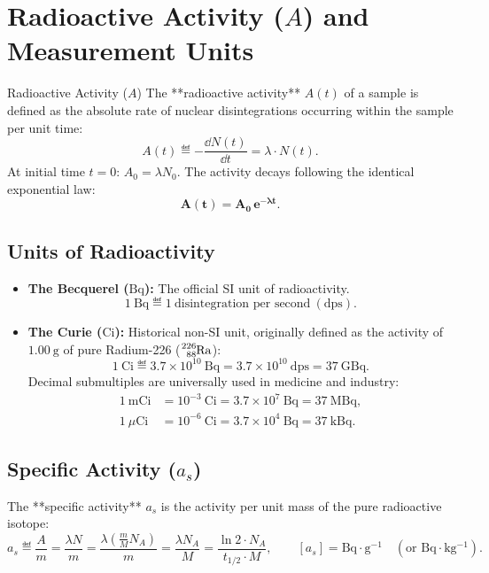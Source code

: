 \section{Radioactive Activity ($A$) and Measurement Units}

\begin{definitionbox}{Radioactive Activity ($A$)}
The **radioactive activity** $A(t)$ of a sample is defined as the absolute rate of nuclear disintegrations occurring within the sample per unit time:
\begin{equation}
A(t) \eqdef -\frac{\dd N(t)}{\dd t} = \lambda \cdot N(t).
\end{equation}
At initial time $t = 0$: $A_0 = \lambda N_0$.
The activity decays following the identical exponential law:
\begin{equation}
\mathbf{A(t) = A_0\,e^{-\lambda t}}.
\end{equation}
\end{definitionbox}

\subsection{Units of Radioactivity}
\begin{itemize}[leftmargin=1.5em,itemsep=4pt]
  \item \textbf{The Becquerel ($\mathrm{Bq}$):} The official SI unit of radioactivity.
  \begin{equation}
  1\ \mathrm{Bq} \eqdef 1\ \text{disintegration per second}\ (\mathrm{dps}).
  \end{equation}
  \item \textbf{The Curie ($\mathrm{Ci}$):} Historical non-SI unit, originally defined as the activity of $1.00\ \mathrm{g}$ of pure Radium-226 ($\ce{^{226}_{88}Ra}$):
  \begin{equation}
  1\ \mathrm{Ci} \eqdef 3.7 \times 10^{10}\ \mathrm{Bq} = 3.7 \times 10^{10}\ \mathrm{dps} = 37\ \mathrm{GBq}.
  \end{equation}
  Decimal submultiples are universally used in medicine and industry:
  \begin{align*}
  1\ \mathrm{mCi} &= 10^{-3}\ \mathrm{Ci} = 3.7 \times 10^7\ \mathrm{Bq} = 37\ \mathrm{MBq}, \\
  1\ \mu\mathrm{Ci} &= 10^{-6}\ \mathrm{Ci} = 3.7 \times 10^4\ \mathrm{Bq} = 37\ \mathrm{kBq}.
  \end{align*}
\end{itemize}

\subsection{Specific Activity ($a_s$)}
The **specific activity** $a_s$ is the activity per unit mass of the pure radioactive isotope:
\begin{equation}
a_s \eqdef \frac{A}{m} = \frac{\lambda N}{m} = \frac{\lambda \left(\frac{m}{M} N_A\right)}{m} = \frac{\lambda N_A}{M} = \frac{\ln 2 \cdot N_A}{t_{1/2} \cdot M}, \qquad [a_s] = \mathrm{Bq\cdot g^{-1}} \quad (\text{or } \mathrm{Bq\cdot kg^{-1}}).
\end{equation}

